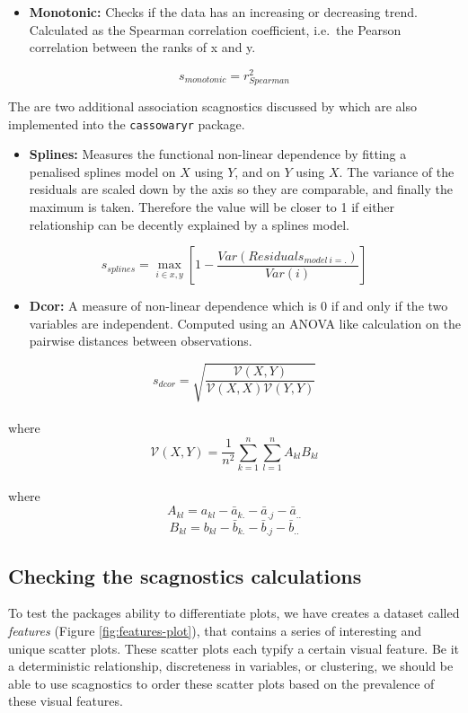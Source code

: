 \begin{itemize}
\tightlist
\item
  \textbf{Monotonic:} Checks if the data has an increasing or decreasing
  trend. Calculated as the Spearman correlation coefficient, i.e.~the
  Pearson correlation between the ranks of x and y.
\end{itemize}

\[s_{monotonic} = r^2_{Spearman}\]

The are two additional association scagnostics discussed by
\citet{Grimm} which are also implemented into the \texttt{cassowaryr}
package.

\begin{itemize}
\tightlist
\item
  \textbf{Splines:} Measures the functional non-linear dependence by
  fitting a penalised splines model on \(X\) using \(Y\), and on \(Y\)
  using \(X\). The variance of the residuals are scaled down by the axis
  so they are comparable, and finally the maximum is taken. Therefore
  the value will be closer to 1 if either relationship can be decently
  explained by a splines model.
\end{itemize}

\[s_{splines}=\max_{i\in x,y}[1-\frac{Var(Residuals_{model~i=.})}{Var(i)}]\]

\begin{itemize}
\tightlist
\item
  \textbf{Dcor:} A measure of non-linear dependence which is 0 if and
  only if the two variables are independent. Computed using an ANOVA
  like calculation on the pairwise distances between observations.
\end{itemize}

\[s_{dcor}= \sqrt{\frac{\mathcal{V}(X,Y)}{\mathcal{V}(X,X)\mathcal{V}(Y,Y)}}\]\\
where \[\mathcal{V}
(X,Y)=\frac{1}{n^2}\sum_{k=1}^n\sum_{l=1}^nA_{kl}B_{kl}\]\\
where \[A_{kl}=a_{kl}-\bar{a}_{k.}-\bar{a}_{.j}-\bar{a}_{..}\]
\[B_{kl}=b_{kl}-\bar{b}_{k.}-\bar{b}_{.j}-\bar{b}_{..}\]

\hypertarget{checking-the-scagnostics-calculations}{%
\subsection{Checking the scagnostics
calculations}\label{checking-the-scagnostics-calculations}}

To test the packages ability to differentiate plots, we have creates a
dataset called \emph{features} (Figure \ref{fig:features-plot}), that
contains a series of interesting and unique scatter plots. These scatter
plots each typify a certain visual feature. Be it a deterministic
relationship, discreteness in variables, or clustering, we should be
able to use scagnostics to order these scatter plots based on the
prevalence of these visual features.


